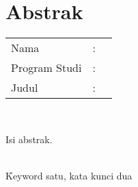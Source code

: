 %
%
%

\chapter*{Abstrak}
\singlespacing

\vspace*{0.2cm}

\noindent \begin{tabular}{l l p{10cm}}
	Nama&: & \penulis \\
	Program Studi&: & \program \\
	Judul&: & \judul \\
\end{tabular} \\

\vspace*{0.5cm}

\noindent Isi abstrak. \\

\vspace*{0.2cm}

\noindent {} \\ \f{Keyword} satu, kata kunci dua \\

\onehalfspacing
\newpage
